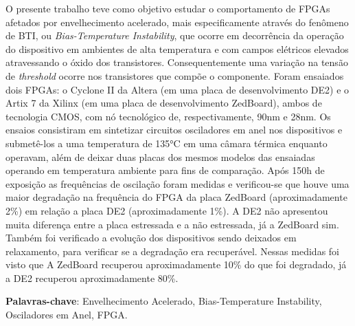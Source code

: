 
\begin{resumo}[Resumo]
O presente trabalho teve como objetivo estudar o comportamento de FPGAs afetados por envelhecimento acelerado, mais especificamente através do fenômeno de BTI, ou \textit{Bias-Temperature Instability}, que ocorre em decorrência da operação do dispositivo em ambientes de alta temperatura e com campos elétricos elevados atravessando o óxido dos transistores. Consequentemente uma variação na tensão de \textit{threshold} ocorre nos transistores que compõe o componente. Foram ensaiados dois FPGAs: o Cyclone II da Altera (em uma placa de desenvolvimento DE2) e o Artix 7 da Xilinx (em uma placa de desenvolvimento ZedBoard), ambos de tecnologia CMOS, com nó tecnológico de, respectivamente, 90nm e 28nm. Os ensaios consistiram em sintetizar circuitos osciladores em anel nos dispositivos e submetê-los a uma temperatura de 135°C em uma câmara térmica enquanto operavam, além de deixar duas placas dos mesmos modelos das ensaiadas operando em temperatura ambiente para fins de comparação. Após 150h de exposição as frequências de oscilação foram medidas e verificou-se que houve uma maior degradação na frequência do FPGA da placa ZedBoard (aproximadamente 2\%) em relação a placa DE2 (aproximadamente 1\%). A DE2 não apresentou muita diferença entre a placa estressada e a não estressada, já a ZedBoard sim. Também foi verificado a evolução dos dispositivos sendo deixados em relaxamento, para verificar se a degradação era recuperável. Nessas medidas foi visto que A ZedBoard recuperou aproximadamente 10\% do que foi degradado, já a DE2 recuperou aproximadamente 80\%.


    \vspace{\onelineskip}
	\noindent
        
	\textbf{Palavras-chave}: Envelhecimento Acelerado, Bias-Temperature Instability, Osciladores em Anel, FPGA.

\end{resumo}

